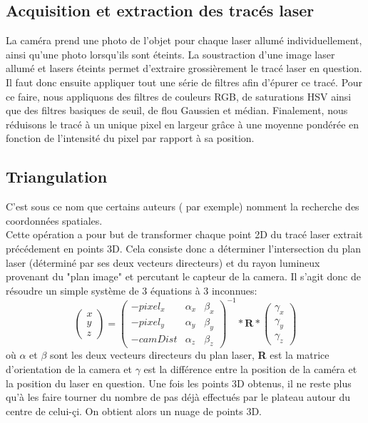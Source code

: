 \documentclass[a4paper,10pt]{report}
\begin{document}
\subsection{Acquisition et extraction des tracés laser}
La caméra prend une photo de l’objet pour chaque laser allumé individuellement, ainsi qu'une photo lorsqu’ils sont éteints. La soustraction d'une image laser allumé et lasers éteints permet d'extraire grossièrement le tracé laser en question. Il faut donc ensuite appliquer tout une série de filtres afin d'épurer ce tracé. Pour ce faire, nous appliquons des filtres de couleurs RGB, de saturations HSV ainsi que des filtres basiques de seuil, de flou Gaussien et médian. Finalement, nous réduisons le tracé à un unique pixel en largeur grâce à une moyenne pondérée en fonction de l'intensité du pixel par rapport à sa position.

\subsection{Triangulation}
C'est sous ce nom que certains auteurs (\cite{Forsyth} par exemple) nomment la recherche des coordonnées spatiales.\\
Cette opération a pour but de transformer chaque point 2D du tracé laser extrait précédement en points 3D. Cela consiste donc a déterminer l'intersection du plan laser (déterminé par ses deux vecteurs directeurs) et du rayon lumineux provenant du "plan image" et percutant le capteur de la camera. Il s'agit donc de résoudre un simple système de 3 équations à 3 inconnues:\\

\begin{equation}
\begin{pmatrix}
x\\ y\\ z
\end{pmatrix}
=
\begin{pmatrix}
-pixel_x & \alpha_x & \beta_x \\
-pixel_y & \alpha_y & \beta_y \\
-camDist & \alpha_z & \beta_z
\end{pmatrix}^{-1}
*\textbf{R}*
\begin{pmatrix}
\gamma_x \\
\gamma_y \\
\gamma_z
\end{pmatrix}
\end{equation}
où $\alpha$ et $\beta$ sont les deux vecteurs directeurs du plan laser, \textbf{R} est la matrice d'orientation de la camera et $\gamma$ est la différence entre la position de la caméra et la position du laser en question.
Une fois les points 3D obtenus, il ne reste plus qu'à les faire tourner du nombre de pas déjà effectués par le plateau autour du centre de celui-çi.
On obtient alors un nuage de points 3D.
\end{document}
